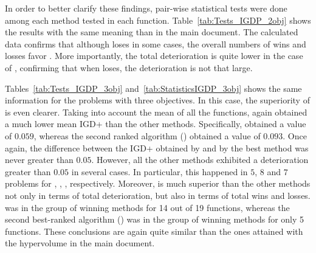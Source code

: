 In order to better clarify these findings, pair-wise statistical tests were done among each method tested in each
function.
%
Table~\ref{tab:Tests_IGDP_2obj} shows the results with the same meaning than in the main document.
%
The calculated data confirms that although \VSDMOEA{} loses in some cases, the overall numbers of wins and losses favor \VSDMOEA{}.
%
More importantly, the total deterioration is quite lower in the case of \VSDMOEA{}, confirming that when \VSDMOEA{} loses, the deterioration is not 
that large.


Tables~\ref{tab:Tests_IGDP_3obj} and~\ref{tab:StatisticsIGDP_3obj} shows the same information for the problems with three objectives.
%
In this case, the superiority of \VSDMOEA{} is even clearer.
%
Taking into account the mean of all the functions, \VSDMOEA{} again obtained a much lower mean IGD+ than the other methods.
%
Specifically, \VSDMOEA{} obtained a value of $0.059$, whereas the second ranked algorithm (\RMOEA{}) obtained a value of $0.093$.
%
Once again, the difference between the IGD+ obtained by \VSDMOEA{} and by the best method was never greater
than $0.05$.
%
However, all the other methods exhibited a deterioration greater than $0.05$ in several cases.
%
In particular, this happened in $5$, $8$ and $7$ problems for \MOEAD{}, \NSGAII{}, \RMOEA{}, respectively.
%
Moreover, \VSDMOEA{} is much superior than the other methods not only in terms of total deterioration, but also
in terms of total wins and losses.
%
\VSDMOEA{} was in the group of winning methods for 14 out of 19 functions, whereas the second best-ranked algorithm (\RMOEA{})
was in the group of winning methods for only 5 functions.
%
These conclusions are again quite similar than the ones attained with the hypervolume in the main document.





